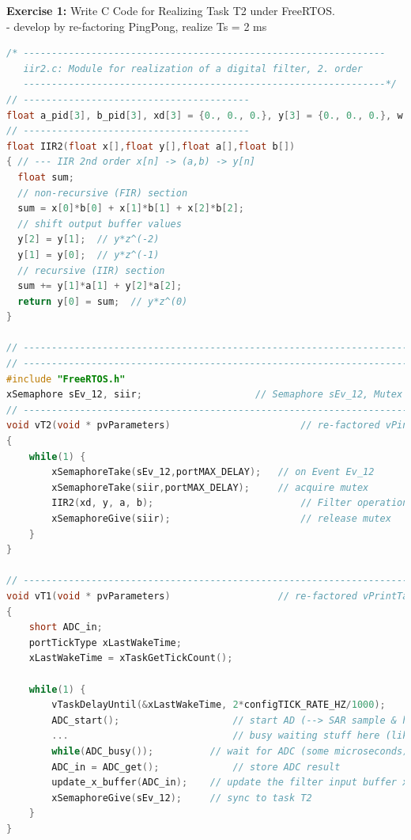 \textbf{Exercise 1:} Write C Code for Realizing Task T2 under FreeRTOS.\\

- develop by re-factoring PingPong, realize Ts = 2 ms

\begin{lstlisting}[style=mystyle, language=c]
/* ----------------------------------------------------------------
   iir2.c: Module for realization of a digital filter, 2. order
   ----------------------------------------------------------------*/
// ----------------------------------------
float a_pid[3], b_pid[3], xd[3] = {0., 0., 0.}, y[3] = {0., 0., 0.}, w = 0.;
// ----------------------------------------
float IIR2(float x[],float y[],float a[],float b[])
{ // --- IIR 2nd order x[n] -> (a,b) -> y[n] 
  float sum;
  // non-recursive (FIR) section
  sum = x[0]*b[0] + x[1]*b[1] + x[2]*b[2];
  // shift output buffer values
  y[2] = y[1];  // y*z^(-2)
  y[1] = y[0];  // y*z^(-1)
  // recursive (IIR) section
  sum += y[1]*a[1] + y[2]*a[2];
  return y[0] = sum;  // y*z^(0)
}

// ----------------------------------------------------------------------------
// ----------------------------------------------------------------------------
#include "FreeRTOS.h"
xSemaphore sEv_12, siir;                   	// Semaphore sEv_12, Mutex siir
// ----------------------------------------------------------------------------
void vT2(void * pvParameters)						// re-factored vPingTask
{	
	while(1) {
		xSemaphoreTake(sEv_12,portMAX_DELAY);	// on Event Ev_12
		xSemaphoreTake(siir,portMAX_DELAY);		// acquire mutex
		IIR2(xd, y, a, b);							// Filter operation
		xSemaphoreGive(siir);						// release mutex
	}
}

// ----------------------------------------------------------------------------
void vT1(void * pvParameters)					// re-factored vPrintTask
{	
	short ADC_in;
	portTickType xLastWakeTime;
	xLastWakeTime = xTaskGetTickCount();

	while(1) {
 		vTaskDelayUntil(&xLastWakeTime, 2*configTICK_RATE_HZ/1000);  	// exact periodic Ts = 2 ms 		
		ADC_start();    				// start AD (--> SAR sample & hold) ...
		...								// busy waiting stuff here (like DAC outputs)
		while(ADC_busy());			// wait for ADC (some microseconds) ...
		ADC_in = ADC_get(); 			// store ADC result				
		update_x_buffer(ADC_in);	// update the filter input buffer xd[]
		xSemaphoreGive(sEv_12);  	// sync to task T2
	}	
}
\end{lstlisting}

